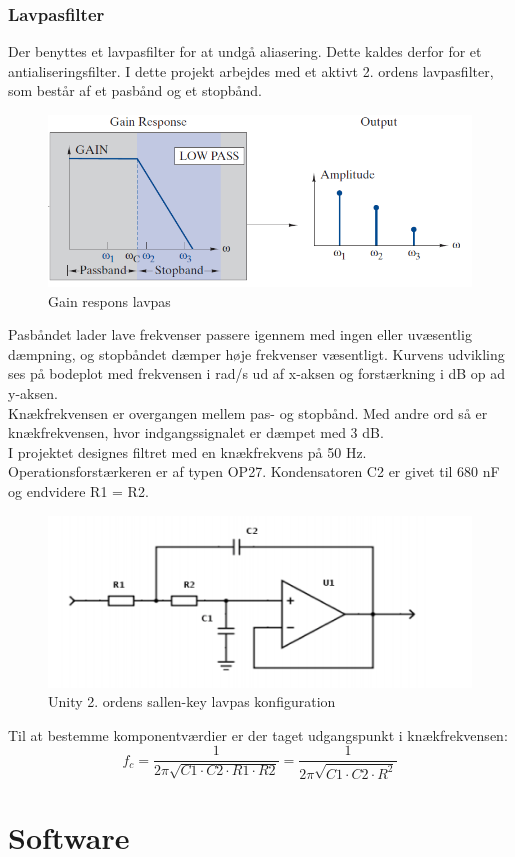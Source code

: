 \subsubsection{Lavpasfilter}
Der benyttes et lavpasfilter for at undgå aliasering. Dette kaldes derfor for et antialiseringsfilter.
I dette projekt arbejdes med et aktivt 2. ordens lavpasfilter, som består af et pasbånd og et stopbånd. 

\begin{figure}[H]
\centering
\includegraphics[scale=0.50]{lavpas.PNG}
\caption{Gain respons lavpas}
\end{figure}

Pasbåndet lader lave frekvenser passere igennem med ingen eller uvæsentlig dæmpning, og stopbåndet dæmper høje frekvenser væsentligt. Kurvens udvikling ses på bodeplot med frekvensen i rad/s ud af x-aksen og forstærkning i dB op ad y-aksen. \\
\newline
Knækfrekvensen er overgangen mellem pas- og stopbånd. Med andre ord så er knækfrekvensen, hvor indgangssignalet er dæmpet med 3 dB. \\
\newline
I projektet designes filtret med en knækfrekvens på 50 Hz. Operationsforstærkeren er af typen OP27. Kondensatoren C2 er givet til 680 nF og endvidere R1 = R2. 

\begin{figure}[H]
\centering
\includegraphics[scale=0.60]{opamp.PNG}
\caption{Unity 2. ordens sallen-key lavpas konfiguration}
\end{figure}

Til at bestemme komponentværdier er der taget udgangspunkt i knækfrekvensen:
$$f_c=\frac{1}{2 \pi \sqrt{C1 \cdot C2 \cdot R1 \cdot R2}} = \frac{1}{2 \pi \sqrt{C1 \cdot C2 \cdot R^2}}$$

\section{Software}

